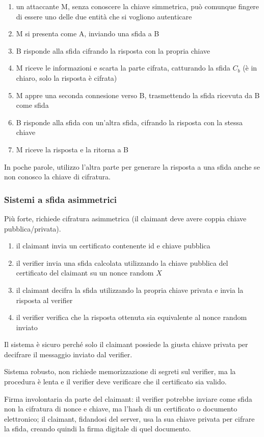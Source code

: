 \documentclass[11pt]{article}
\begin{document}
\begin{enumerate}
    \item un attaccante M, senza conoscere la chiave simmetrica, può comunque fingere di essere uno delle due entità che 
    si vogliono autenticare 
    \item M si presenta come A, inviando una sfida a B 
    \item B risponde alla sfida cifrando la risposta con la propria chiave 
    \item M riceve le informazioni e scarta la parte cifrata, catturando la sfida $C_b$ (è in chiaro, solo la risposta è 
    cifrata)
    \item M appre una seconda connesione verso B, trasmettendo la sfida ricevuta da B come sfida 
    \item B risponde alla sfida con un'altra sfida, cifrando la risposta con la stessa chiave 
    \item M riceve la risposta e la ritorna a B 
\end{enumerate}
In poche parole, utilizzo l'altra parte per generare la risposta a una sfida anche se non conosco la chiave di cifratura.
\subsubsection{Sistemi a sfida asimmetrici}
Più forte, richiede cifratura asimmetrica (il claimant deve avere coppia chiave pubblica/privata). 
\begin{enumerate}
    \item il claimant invia un certificato contenente id e chiave pubblica 
    \item il verifier invia una sfida calcolata utilizzando la chiave pubblica del certificato del claimant su un nonce 
    random $X$ 
    \item il claimant decifra la sfida utilizzando la propria chiave privata e invia la risposta al verifier 
    \item il verifier verifica che la risposta ottenuta sia equivalente al nonce random inviato  
\end{enumerate}
Il sistema è sicuro perché solo il claimant possiede la giusta chiave privata per decifrare il messaggio inviato dal verifier.

Sistema robusto, non richiede memorizzazione di segreti sul verifier, ma la procedura è lenta e il verifier deve verificare 
che il certificato sia valido.

Firma involontaria da parte del claimant: il verifier potrebbe inviare come sfida non la cifratura di nonce e chiave, ma 
l'hash di un certificato o documento elettronico; il claimant, fidandosi del server, usa la sua chiave privata per cifrare 
la sfida, creando quindi la firma digitale di quel documento.
\end{document}
